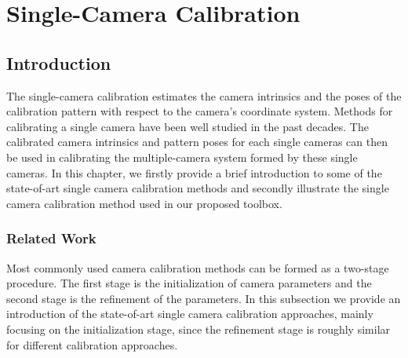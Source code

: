 \documentclass{report}
\begin{document}
\chapter{Single-Camera Calibration}
\label{singleSec}

\section{Introduction}
The single-camera calibration estimates the camera intrinsics and the poses of the calibration pattern with respect to the camera's coordinate system. Methods for calibrating a single camera have been well studied in the past decades. The calibrated camera intrinsics and pattern poses for each single cameras can then be used in calibrating the multiple-camera system formed by these single cameras. In this chapter, we firstly provide a brief introduction to some of the state-of-art single camera calibration methods and secondly illustrate the single camera calibration method used in our proposed toolbox. 



\subsection{Related Work}
Most commonly used camera calibration methods can be formed as a two-stage procedure. The first stage is the initialization of camera parameters and the second stage is the refinement of the parameters. In this subsection we provide an introduction of the state-of-art single camera calibration approaches, mainly focusing on the initialization stage, since the refinement stage is roughly similar for different calibration approaches. 
\end{document}
